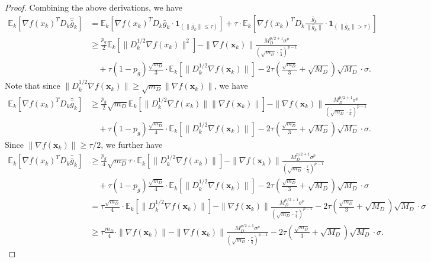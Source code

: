 \documentclass{article}
\newcommand{\bx}{\boldsymbol{x}}
\newcommand{\barg}{\bar{g}}
\theoremstyle{plain}
\theoremstyle{definition}
\theoremstyle{remark}
\begin{document}
\begin{proof}
Combining the above derivations, we have
\begin{align*}
    \mathbb{E}_k[\nabla f(x_k)^T D_k \widehat{\barg}_k ] & = \mathbb{E}_k[\nabla f(x_k)^T D_k \bar{g}_k \cdot \boldsymbol{1}_{(\|\bar{g}_k\| \le \tau)} ]  + \tau \cdot \mathbb{E}_k\left[\nabla f(x_k)^T D_k \frac{\bar{g}_k}{\|\bar{g}_k\|} \cdot \boldsymbol{1}_{(\|\bar{g}_k\| > \tau)} \right] \\
    & \geq \frac{p_g}{2}\mathbb{E}_k[\| D_k^{1/2} \nabla f(x_k)\|^2] -  \|\nabla f(\bx_k)\|\frac{M_D^{p/2+1} \sigma^p}{\left(\sqrt{m_D}\cdot\frac{\tau}{4}\right)^{p-1}} \\
    & \quad + \tau (1-p_g) \frac{\sqrt{m_D}}{3} \cdot \mathbb{E}_k\left[\| D_k^{1/2}\nabla f(\bx_k)\|\right]  - 2\tau \left( \frac{\sqrt{m_D}}{3} + \sqrt{M_D}\right) \sqrt{M_D} \cdot \sigma .
\end{align*}
Note that since $\|D_k^{1/2}\nabla f(\bx_k)\|\geq \sqrt{m_D}\|\nabla f(\bx_k)\|$, we have
\begin{align*}
    \mathbb{E}_k[\nabla f(x_k)^T D_k \widehat{\barg}_k ]
    & \geq \frac{p_g}{2}\sqrt{m_D}\mathbb{E}_k[\| D_k^{1/2} \nabla f(x_k)\|\|\nabla f(\bx_k)\|] -  \|\nabla f(\bx_k)\|\frac{M_D^{p/2+1} \sigma^p}{\left(\sqrt{m_D}\cdot\frac{\tau}{4}\right)^{p-1}} \\
    & \quad + \tau (1-p_g) \frac{\sqrt{m_D}}{4} \cdot \mathbb{E}_k\left[\| D_k^{1/2}\nabla f(\bx_k)\|\right]  - 2\tau \left( \frac{\sqrt{m_D}}{3} + \sqrt{M_D}\right) \sqrt{M_D} \cdot \sigma .
\end{align*}
Since $\|\nabla f(\bx_k)\|\geq \tau/2$, we further have
\begin{align*}
    \mathbb{E}_k[\nabla f(x_k)^T D_k \widehat{\barg}_k ]
    & \geq \frac{p_g}{4}\sqrt{m_D}\tau\cdot\mathbb{E}_k[\| D_k^{1/2} \nabla f(x_k)\|] -  \|\nabla f(\bx_k)\|\frac{M_D^{p/2+1} \sigma^p}{\left(\sqrt{m_D}\cdot\frac{\tau}{4}\right)^{p-1}} \\
    & \quad + \tau (1-p_g) \frac{\sqrt{m_D}}{4} \cdot \mathbb{E}_k\left[\| D_k^{1/2}\nabla f(\bx_k)\|\right]  - 2\tau \left( \frac{\sqrt{m_D}}{3} + \sqrt{M_D}\right) \sqrt{M_D} \cdot \sigma \\
    & = \tau  \frac{\sqrt{m_D}}{4} \cdot \mathbb{E}_k\left[\| D_k^{1/2}\nabla f(\bx_k)\|\right] -  \|\nabla f(\bx_k)\|\frac{M_D^{p/2+1} \sigma^p}{\left(\sqrt{m_D}\cdot\frac{\tau}{4}\right)^{p-1}} - 2\tau \left( \frac{\sqrt{m_D}}{3} + \sqrt{M_D}\right) \sqrt{M_D} \cdot \sigma \\
    & \geq \tau  \frac{m_D}{4} \cdot \| \nabla f(\bx_k)\| -  \|\nabla f(\bx_k)\|\frac{M_D^{p/2+1} \sigma^p}{\left(\sqrt{m_D}\cdot\frac{\tau}{4}\right)^{p-1}} - 2\tau \left( \frac{\sqrt{m_D}}{3} + \sqrt{M_D}\right) \sqrt{M_D} \cdot \sigma.

\end{align*}
\end{proof}
\end{document}
